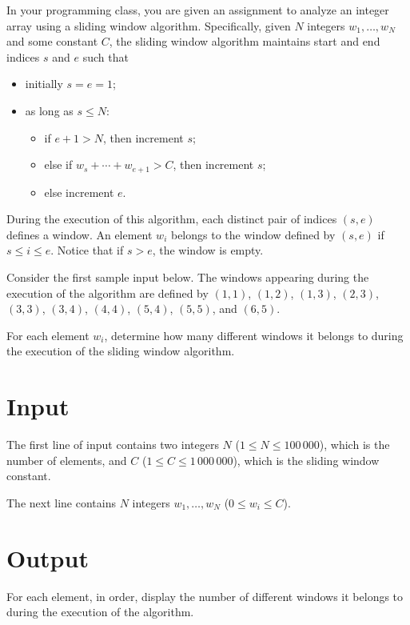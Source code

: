 
In your programming class, you are given an assignment to analyze an
integer array using a sliding window algorithm.  Specifically, given
$N$ integers $w_1, \ldots, w_N$ and some constant $C$, the sliding
window algorithm maintains start and end indices $s$ and $e$ such that
\begin{itemize}
\item initially $s = e  = 1$;
\item as long as $s \leq N$:
  \begin{itemize}
  \item if $e+1 > N$, then increment $s$;
  \item else if $w_s + \cdots + w_{e+1} > C$, then
    increment $s$;
  \item else increment $e$.
  \end{itemize}
\end{itemize}
During the execution of this algorithm, each distinct pair of indices
$(s,e)$ defines a window.  An element $w_i$ belongs to the window
defined by $(s,e)$ if $s \leq i \leq e$.  Notice that if $s > e$, the
window is empty.

Consider the first sample input below.  The windows appearing
during the execution of the algorithm are defined by $(1,1)$, $(1,2)$,
$(1,3)$, $(2,3)$, $(3,3)$, $(3,4)$, $(4,4)$, $(5,4)$, $(5,5)$, and
$(6,5)$.

For each element $w_i$, determine how many different windows it
belongs to during the execution of the sliding window algorithm.

\section*{Input}

The first line of input contains two integers $N$
($1 \leq N \leq 100\,000$), which is the number of elements, and $C$
($1 \leq C \leq 1\,000\,000$), which is the sliding window constant. 

The next line contains $N$ integers $w_1, \ldots, w_N$ 
($0 \leq w_i \leq C$).

\section*{Output}
For each element, in order, display the number of different
windows it belongs to during the execution of the algorithm.

